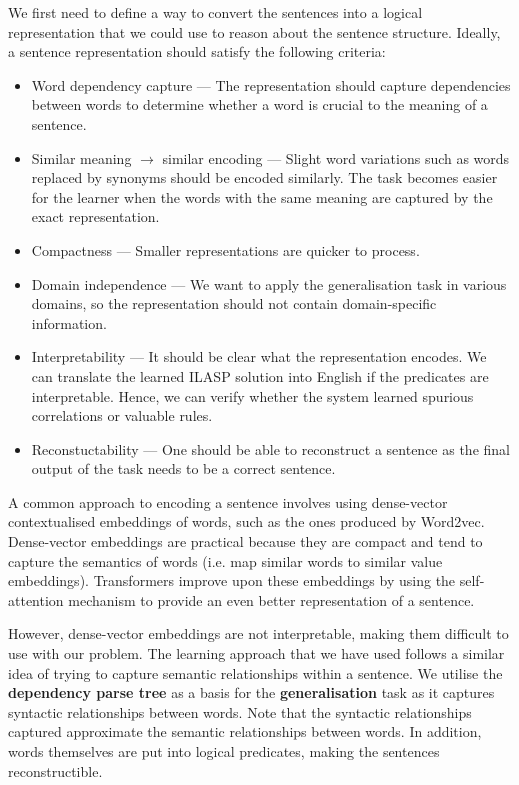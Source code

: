 We first need to define a way to convert the sentences into a logical representation that we could use to reason about the sentence structure.
Ideally, a sentence representation should satisfy the following criteria:
\begin{itemize}
    \item Word dependency capture --- The representation should capture dependencies between words to determine whether a word is crucial to the meaning of a sentence.
    \item Similar meaning $\rightarrow$ similar encoding --- Slight word variations such as words replaced by synonyms should be encoded similarly. The task becomes easier for the learner when the words with the same meaning are captured by the exact representation.
    \item Compactness --- Smaller representations are quicker to process. 
    \item Domain independence --- We want to apply the generalisation task in various domains, so the representation should not contain domain-specific information.
    \item Interpretability --- It should be clear what the representation encodes. We can translate the learned ILASP solution into English if the predicates are interpretable. Hence, we can verify whether the system learned spurious correlations or valuable rules.
    \item Reconstuctability --- One should be able to reconstruct a sentence as the final output of the task needs to be a correct sentence.
\end{itemize}


A common approach to encoding a sentence involves using dense-vector contextualised embeddings of words, such as the ones produced by Word2vec.
Dense-vector embeddings are practical because they are compact and tend to capture the semantics of words (i.e. map similar words to similar value embeddings).
Transformers improve upon these embeddings by using the self-attention mechanism to provide an even better representation of a sentence.

However, dense-vector embeddings are not interpretable, making them difficult to use with our problem. 
The learning approach that we have used follows a similar idea of trying to capture semantic relationships within a sentence.
We utilise the \textbf{dependency parse tree} as a basis for the \textbf{generalisation} task as it captures syntactic relationships between words.
Note that the syntactic relationships captured approximate the semantic relationships between words.
In addition, words themselves are put into logical predicates, making the sentences reconstructible.

